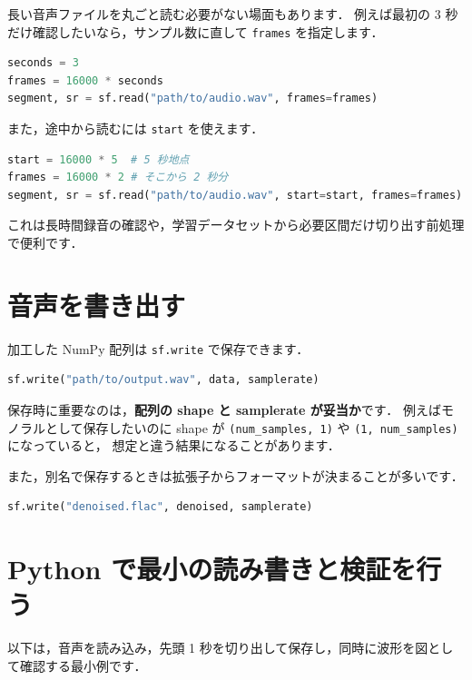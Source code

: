 長い音声ファイルを丸ごと読む必要がない場面もあります．
例えば最初の 3 秒だけ確認したいなら，サンプル数に直して \texttt{frames} を指定します．

\begin{lstlisting}[style=codecell,language=Python]
seconds = 3
frames = 16000 * seconds
segment, sr = sf.read("path/to/audio.wav", frames=frames)
\end{lstlisting}

また，途中から読むには \texttt{start} を使えます．

\begin{lstlisting}[style=codecell,language=Python]
start = 16000 * 5  # 5 秒地点
frames = 16000 * 2 # そこから 2 秒分
segment, sr = sf.read("path/to/audio.wav", start=start, frames=frames)
\end{lstlisting}

これは長時間録音の確認や，学習データセットから必要区間だけ切り出す前処理で便利です．


\section{音声を書き出す}

加工した NumPy 配列は \texttt{sf.write} で保存できます．

\begin{lstlisting}[style=codecell,language=Python]
sf.write("path/to/output.wav", data, samplerate)
\end{lstlisting}

保存時に重要なのは，\textbf{配列の shape と samplerate が妥当か}です．
例えばモノラルとして保存したいのに shape が \texttt{(num\_samples, 1)} や \texttt{(1, num\_samples)} になっていると，
想定と違う結果になることがあります．

また，別名で保存するときは拡張子からフォーマットが決まることが多いです．

\begin{lstlisting}[style=codecell,language=Python]
sf.write("denoised.flac", denoised, samplerate)
\end{lstlisting}


\section{Python で最小の読み書きと検証を行う}

以下は，音声を読み込み，先頭 1 秒を切り出して保存し，同時に波形を図として確認する最小例です．

